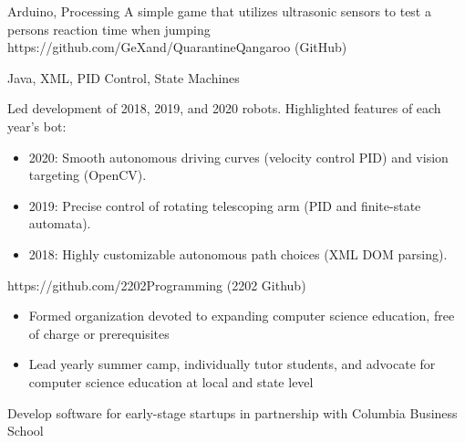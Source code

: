 \documentclass[10pt, letterpaper]{awesome-cv}
\begin{document}
\vspace*{-1ex}
\vspace*{-2ex}
\begin{projects}
    	{Arduino, Processing}
    	{A simple game that utilizes ultrasonic sensors to test a persons reaction time when jumping}
    	{https://github.com/GeXand/QuarantineQangaroo}
    	{(GitHub)}

	{Java, XML, PID Control, State Machines}
	{Led development of 2018, 2019, and 2020 robots. Highlighted features of each year's bot:
	\begin{itemize}[noitemsep, label=\bullet]
		\item 2020: Smooth autonomous driving curves (velocity control PID) and vision targeting (OpenCV). 
		\item 2019: Precise control of rotating telescoping arm (PID and finite-state automata).
		\item 2018: Highly customizable autonomous path choices (XML DOM parsing).
	\end{itemize}}
	{https://github.com/2202Programming}
	{(2202 Github)}
        
\end{projects}

\vspace*{-1ex}    
\vspace*{-2ex}    
\begin{skills}
    {\vspace*{-2.5ex}
    \begin{itemize}[noitemsep, label=\bullet]
        \item Formed organization devoted to expanding computer science education, free of charge or prerequisites
        \item Lead yearly summer camp, individually tutor students, and advocate for computer science education at local and state level
    \end{itemize}
    \vspace*{-3.5ex}}
    
	{Develop software for early-stage startups in partnership with Columbia Business School}
\end{skills}
\end{document}
